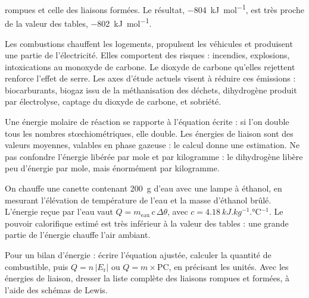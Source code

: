 rompues et celle des liaisons formées. Le résultat, \qty{-804}{kJ.mol^{-1}}, est très proche de la valeur des tables, \qty{-802}{kJ.mol^{-1}}.
\begin{propriete}
Les combustions chauffent les logements, propulsent les véhicules et produisent une partie de l'électricité. Elles
comportent des risques : incendies, explosions, intoxications au monoxyde de carbone. Le dioxyde de carbone qu'elles
rejettent renforce l'effet de serre. Les axes d'étude actuels visent à réduire ces émissions : biocarburants, biogaz issu
de la méthanisation des déchets, dihydrogène produit par électrolyse, captage du dioxyde de carbone, et sobriété.
\end{propriete}
\begin{attention}
Une énergie molaire de réaction se rapporte à l'équation écrite : si l'on double tous les nombres stœchiométriques,
elle double. Les énergies de liaison sont des valeurs moyennes, valables en phase gazeuse : le calcul donne une estimation.
Ne pas confondre l'énergie libérée par mole et par kilogramme : le dihydrogène libère peu d'énergie par mole, mais
énormément par kilogramme.
\end{attention}
\begin{experience}
On chauffe une canette contenant \qty{200}{g} d'eau avec une lampe à éthanol, en mesurant l'élévation de température de l'eau
et la masse d'éthanol brûlé. L'énergie reçue par l'eau vaut $Q=m_\text{eau}\,c\,\Delta\theta$, avec $c=\qty{4,18}{kJ.kg^{-1}.\degreeCelsius^{-1}}$. Le pouvoir
calorifique estimé est très inférieur à la valeur des tables : une grande partie de l'énergie chauffe l'air ambiant.
\end{experience}
\begin{rediger}
Pour un bilan d'énergie : écrire l'équation ajustée, calculer la quantité de combustible, puis $Q=n\,|E_\mathrm{r}|$ ou $Q=m\times\mathrm{PC}$, en
précisant les unités. Avec les énergies de liaison, dresser la liste complète des liaisons rompues et formées, à l'aide des
schémas de Lewis.
\end{rediger}
\exercices

